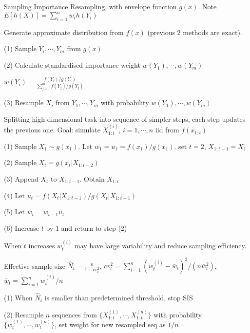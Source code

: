\documentclass{article}
\renewcommand{\subsection}[1]{\text{\hl{[#1]}}}
\begin{document}
\subsection{SIR}

Sampling Importance Resampling, with envelope function $g(x)$.
Note $E[h(X)] = \sum_{i=1}^n w_i h(Y_i)$

Generate approximate distribution from $f(x)$ (previous 2 methods are exact).

(1) Sample $Y_i, \cdots, Y_m$ from $g(x)$

(2) Calculate standardised importance weight $w(Y_1), \cdots, w(Y_m)$

$w(Y_i) = \frac{f(Y_i) / g(Y_i)}{\sum_{j=1}^m f(Y_j)/g(Y_j)}$

(3) Resample $X_i$ from $Y_1, \cdots, Y_m$ with probability $w(Y_1), \cdots, w(Y_m)$

\subsection{Sequential MC}

Splitting high-dimensional task into sequence of simpler steps, each step updates the previous one.
Goal: simulate $X_{1:t}^{(i)}$, $i=1, \cdots, n$ iid from $f(x_{1:t})$

(1) Sample $X_1\sim g(x_1)$. Let $w_1 = u_1 = f(x_1)/g(x_1)$. set $t=2$, $X_{1:t-1}=X_1$

(2) Sample $X_t=g(x_t|X_{1:t-2})$

(3) Append $X_t$ to $X_{1:t-1}$. Obtain $X_{1:t}$

(4) Let $u_t = f(X_t|X_{1:t-1})/g(X_t|X_{1:t-1})$

(5) Let $w_t = w_{t-1}u_t$

(6) Increase $t$ by 1 and return to step (2)

\subsection{SISR}

When $t$ increases $w_t^{(i)}$ may have large variability and reduce sampling efficiency.

Effective sample size $\hat N_t = \frac{n}{1 + cv_t^2}$, $cv_t^2 = \sum_{i=1}^{n} (w_t^{(i)} - \bar w_t )^2 / (n \bar w_t^2)$,
$\bar w_t = \sum_{i=1}^n w_t^{(i)} / n$

(1) When $\hat N_t$ is smaller than predetermined threshold, stop SIS

(2) Resample $n$ sequences from $\{ X_{1:t}^{(1)}, \cdots, X_{1:t}^{(n)} \}$
with probability $\{w_t^{(1)}, \cdots, w_t^{(n)}\}$, set weight for new resampled seq as $1/n$
\end{document}
